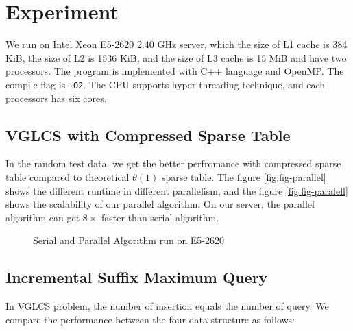 \section{Experiment}
\label{sec:Experiment}

We run on Intel Xeon E5-2620 2.40 GHz server, which the size of L1
cache is 384 KiB, the size of L2 is 1536 KiB, and the size of L3 cache
is 15 MiB and have two processors.  The program is implemented with
C++ language and OpenMP. The compile flag is \texttt{-O2}.  The CPU
supports hyper threading technique, and each processors has six cores.

\subsection{VGLCS with Compressed Sparse Table}

In the random test data, we get the better perfromance with compressed
sparse table compared to theoretical $\theta(1)$ sparse table.  The
figure \ref{fig:fig-parallel} shows the different runtime in different
parallelism, and the figure \ref{fig:fig-paralell} shows the
scalability of our parallel algorithm.  On our server, the parallel
algorithm can get $8 \times$ faster than serial algorithm.

\begin{figure*}[!thb]
  \centering
  \subfigure[Runtime]{
    
    \label{fig:fig-parallel}
  }
  \subfigure[Scalability]{
    
    \label{fig:fig-parallel-scala}
  }
  \caption{Serial and Parallel Algorithm run on E5-2620}
\end{figure*}



\subsection{Incremental Suffix Maximum Query}

In VGLCS problem, the number of insertion equals the number of query.
We compare the performance between the four data structure as follows:

